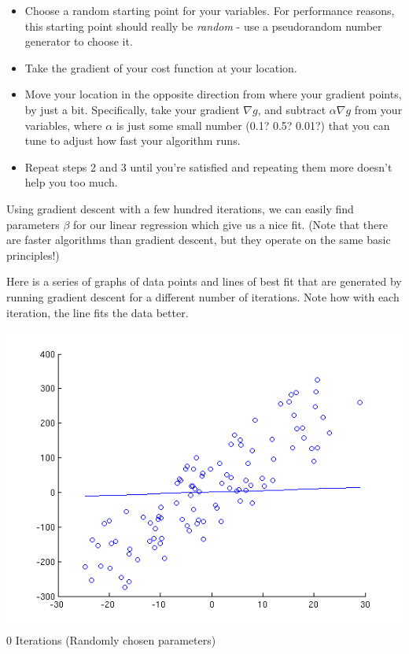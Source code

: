 \documentclass[a4paper]{article}
\begin{document}
\begin{itemize}
    \item
        Choose a random starting point for your variables. For performance reasons, this starting
        point should really be \emph{random} - use a pseudorandom number generator to choose it.
    \item
        Take the gradient of your cost function at your location.
    \item
        Move your location in the opposite direction from where your gradient points, by just a bit.
        Specifically, take your gradient \(\nabla g\), and subtract \(\alpha \nabla g\) from your variables,
        where \(\alpha\) is just some small number (0.1? 0.5? 0.01?) that you can tune to adjust how fast
        your algorithm runs.
    \item
        Repeat steps 2 and 3 until you're satisfied and repeating them more doesn't help you too much.
\end{itemize}

Using gradient descent with a few hundred iterations, we can easily find parameters \(\beta\) for our linear regression which give us a nice fit. (Note that there are faster algorithms than gradient descent, but they operate on the same basic principles!)

Here is a series of graphs of data points and lines of best fit that are generated by running
gradient descent for a different number of iterations. Note how with each iteration, the line fits
the data better.

\begin{center}
    \includegraphics[scale=0.5]{images/0.png}\\
    0 Iterations (Randomly chosen parameters)
\end{center}
\end{document}
